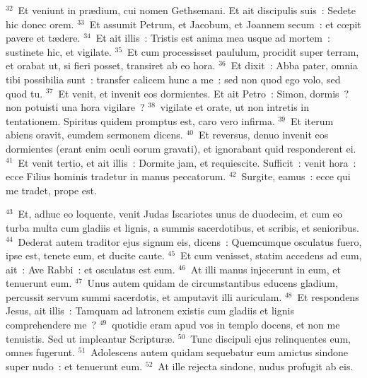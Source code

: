 ${}^{32}$~Et veniunt in pr\ae dium, cui nomen Gethsemani. Et ait discipulis suis~: Sedete hic donec orem.
${}^{33}$~Et assumit Petrum, et Jacobum, et Joannem secum~: et cœpit pavere et t\ae dere.
${}^{34}$~Et ait illis~: Tristis est anima mea usque ad mortem~: sustinete hic, et vigilate.
${}^{35}$~Et cum processisset paululum, procidit super terram, et orabat ut, si fieri posset, transiret ab eo hora.
${}^{36}$~Et dixit~: Abba pater, omnia tibi possibilia sunt~: transfer calicem hunc a me~: sed non quod ego volo, sed quod tu.
${}^{37}$~Et venit, et invenit eos dormientes. Et ait Petro~: Simon, dormis~? non potuisti una hora vigilare~?
${}^{38}$~vigilate et orate, ut non intretis in tentationem. Spiritus quidem promptus est, caro vero infirma.
${}^{39}$~Et iterum abiens oravit, eumdem sermonem dicens.
${}^{40}$~Et reversus, denuo invenit eos dormientes (erant enim oculi eorum gravati), et ignorabant quid responderent ei.
${}^{41}$~Et venit tertio, et ait illis~: Dormite jam, et requiescite. Sufficit~: venit hora~: ecce Filius hominis tradetur in manus peccatorum.
${}^{42}$~Surgite, eamus~: ecce qui me tradet, prope est.


${}^{43}$~Et, adhuc eo loquente, venit Judas Iscariotes unus de duodecim, et cum eo turba multa cum gladiis et lignis, a summis sacerdotibus, et scribis, et senioribus.
${}^{44}$~Dederat autem traditor ejus signum eis, dicens~: Quemcumque osculatus fuero, ipse est, tenete eum, et ducite caute.
${}^{45}$~Et cum venisset, statim accedens ad eum, ait~: Ave Rabbi~: et osculatus est eum.
${}^{46}$~At illi manus injecerunt in eum, et tenuerunt eum.
${}^{47}$~Unus autem quidam de circumstantibus educens gladium, percussit servum summi sacerdotis, et amputavit illi auriculam.
${}^{48}$~Et respondens Jesus, ait illis~: Tamquam ad latronem existis cum gladiis et lignis comprehendere me~?
${}^{49}$~quotidie eram apud vos in templo docens, et non me tenuistis. Sed ut impleantur Scriptur\ae .
${}^{50}$~Tunc discipuli ejus relinquentes eum, omnes fugerunt.
${}^{51}$~Adolescens autem quidam sequebatur eum amictus sindone super nudo~: et tenuerunt eum.
${}^{52}$~At ille rejecta sindone, nudus profugit ab eis.


